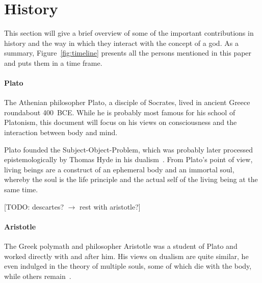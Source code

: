 \section{History}
\label{sec:History}

\begin{figure*}
    \caption[The Timeline]{Timeline of the presented persons. Those grayed out are left as a reference for other mentions in this document~\cite{wikimedia2021}. Rounded rectangles ( and ) denote the full life span of the respective person.}
    \label{fig:timeline}
\end{figure*}

This section will give a brief overview of some of the important contributions in history and the way in which they interact with the concept of a god.
As a summary, Figure~\ref{fig:timeline} presents all the persons mentioned in this paper and puts them in a time frame.

\paragraph{Plato}
The Athenian philosopher Plato, a disciple of Socrates, lived in ancient Greece roundabout 400~BCE.
While he is probably most famous for his school of Platonism, this document will focus on his views on consciousness and the interaction between body and mind.

Plato founded the Subject-Object-Problem, which was probably later processed epistemologically by Thomas Hyde in his dualism~\cite{plato360}.
From Plato's point of view, living beings are a construct of an ephemeral body and an immortal soul, whereby the soul is the life principle and the actual self of the living being at the same time.

[TODO: descartes? $\to$ rest with aristotle?]

\paragraph{Aristotle}
The Greek polymath and philosopher Aristotle was a student of Plato and worked directly with and after him.
His views on dualism are quite similar, he even indulged in the theory of multiple souls, some of which die with the body, while others remain~\cite{aristotle350,hicks2015aristotle}.

